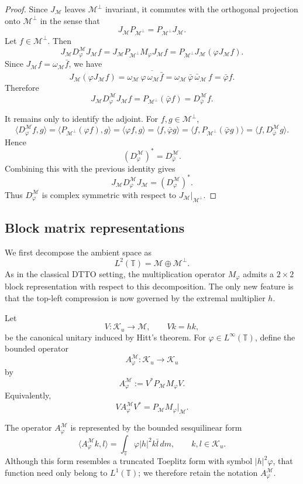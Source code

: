 \documentclass[12pt]{amsart}
\theoremstyle{definition}
\theoremstyle{remark}
\def \T{\mathbb{T}}
\newcommand{\clm}{\mathcal{M}}
\newcommand{\clk}{\mathcal{K}}
\newcommand{\vp}{\varphi}
\numberwithin{equation}{section}
\begin{document}
\begin{proof}
Since $J_\clm$ leaves $\clm^\perp$ invariant, it commutes with the
orthogonal projection onto $\clm^\perp$ in the sense that
\[
J_\clm P_{\clm^\perp}
=
P_{\clm^\perp}J_\clm.
\]
Let $f\in\clm^\perp$. Then
\[
J_\clm D_\vp^\clm J_\clm f
=
J_\clm P_{\clm^\perp}M_\vp J_\clm f
=
P_{\clm^\perp}J_\clm(\vp J_\clm f).
\]
Since $J_\clm f=\omega_\clm\bar f$, we have
\[
J_\clm(\vp J_\clm f)
=
\omega_\clm\,\overline{\vp\,\omega_\clm\bar f}
=
\omega_\clm\,\bar\vp\,\bar\omega_\clm\,f
=
\bar\vp f.
\]
Therefore
\[
J_\clm D_\vp^\clm J_\clm f
=
P_{\clm^\perp}(\bar\vp f)
=
D_{\bar\vp}^\clm f.
\]

It remains only to identify the adjoint. For $f,g\in\clm^\perp$,
\[
\langle D_\vp^\clm f,g\rangle
=
\langle P_{\clm^\perp}(\vp f),g\rangle
=
\langle \vp f,g\rangle
=
\langle f,\bar\vp g\rangle
=
\langle f,P_{\clm^\perp}(\bar\vp g)\rangle
=
\langle f,D_{\bar\vp}^\clm g\rangle.
\]
Hence
\[
(D_\vp^\clm)^*=D_{\bar\vp}^\clm.
\]
Combining this with the previous identity gives
\[
J_\clm D_\vp^\clm J_\clm
=
(D_\vp^\clm)^*.
\]
Thus $D_\vp^\clm$ is complex symmetric with respect to
$J_\clm|_{\clm^\perp}$.
\end{proof}


\subsection{Block matrix representations}

We first decompose the ambient space as
\[
L^2(\T)=\clm\oplus\clm^\perp.
\]
As in the classical DTTO setting, the multiplication operator $M_\vp$
admits a $2\times 2$ block representation with respect to this
decomposition. The only new feature is that the top-left compression is
now governed by the extremal multiplier $h$.

Let
\[
V:\clk_u\to \clm,\qquad Vk=hk,
\]
be the canonical unitary induced by Hitt's theorem. For
$\vp\in L^\infty(\T)$, define the bounded operator
\[
A_\vp^\clm:\clk_u\to \clk_u
\]
by
\[
A_\vp^\clm:=V^*P_\clm M_\vp V.
\]
Equivalently,
\[
V A_\vp^\clm V^*
=
P_\clm M_\vp\big|_{\clm}.
\]

The operator $A_\vp^\clm$ is represented by the bounded sesquilinear
form
\[
\langle A_\vp^\clm k,l\rangle
=
\int_\T \vp |h|^2 k\bar l\,dm,
\qquad k,l\in\clk_u.
\]
Although this form resembles a truncated Toeplitz form with symbol $|h|^2\vp$, that function need only belong to $L^1(\T)$; we therefore retain the notation $A_\vp^\clm$.
\end{document}
